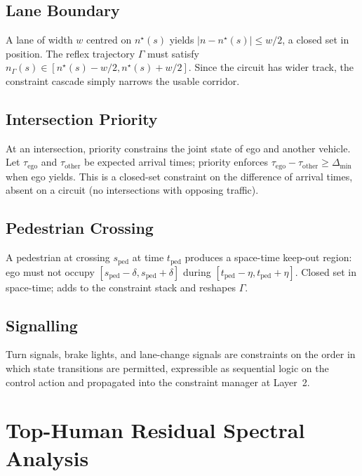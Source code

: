 \documentclass[11pt,twocolumn]{article}
\theoremstyle{definition}
\theoremstyle{remark}
\begin{document}
\subsection{Lane Boundary}

A lane of width $w$ centred on $n^{\star}(s)$ yields $|n - n^{\star}(s)| \le w/2$, a closed set in position. The reflex trajectory $\Gamma$ must satisfy $n_{\Gamma}(s) \in [n^{\star}(s) - w/2, n^{\star}(s) + w/2]$. Since the circuit has wider track, the constraint cascade simply narrows the usable corridor.

\subsection{Intersection Priority}

At an intersection, priority constrains the joint state of ego and another vehicle. Let $\tau_{\mathrm{ego}}$ and $\tau_{\mathrm{other}}$ be expected arrival times; priority enforces $\tau_{\mathrm{ego}} - \tau_{\mathrm{other}} \ge \Delta_{\mathrm{min}}$ when ego yields. This is a closed-set constraint on the difference of arrival times, absent on a circuit (no intersections with opposing traffic).

\subsection{Pedestrian Crossing}

A pedestrian at crossing $s_{\mathrm{ped}}$ at time $t_{\mathrm{ped}}$ produces a space-time keep-out region: ego must not occupy $[s_{\mathrm{ped}} - \delta, s_{\mathrm{ped}} + \delta]$ during $[t_{\mathrm{ped}} - \eta, t_{\mathrm{ped}} + \eta]$. Closed set in space-time; adds to the constraint stack and reshapes $\Gamma$.

\subsection{Signalling}

Turn signals, brake lights, and lane-change signals are constraints on the order in which state transitions are permitted, expressible as sequential logic on the control action and propagated into the constraint manager at Layer~2.

\section{Top-Human Residual Spectral Analysis}
\label{app:spectral}
\end{document}
